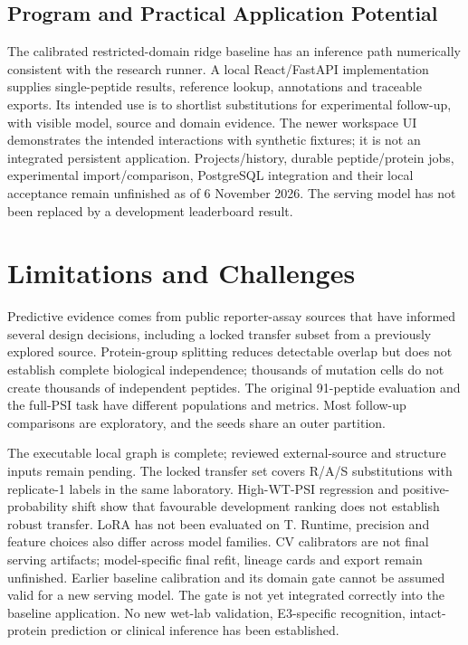 \subsection{Program and Practical Application Potential}
The calibrated restricted-domain ridge baseline has an inference path numerically consistent with
the research runner. A local React/FastAPI implementation supplies single-peptide results, reference
lookup, annotations and traceable exports. Its intended use is to shortlist substitutions for
experimental follow-up, with visible model, source and domain evidence.
The newer workspace UI demonstrates the intended interactions with synthetic fixtures; it is not
an integrated persistent application. Projects/history, durable peptide/protein jobs, experimental
import/comparison, PostgreSQL integration and their local acceptance remain unfinished as of
6 November 2026. The serving model has not been replaced by a development leaderboard result.

\section{Limitations and Challenges}
Predictive evidence comes from public reporter-assay sources that have informed several design
decisions, including a locked transfer subset from a previously explored source. Protein-group
splitting reduces detectable overlap but does not establish
complete biological independence; thousands of mutation cells do not create thousands of independent
peptides. The original 91-peptide evaluation and the full-PSI task have different populations and
metrics. Most follow-up comparisons are exploratory, and the seeds share an outer partition.

The executable local graph is complete; reviewed external-source and structure inputs remain pending.
The locked transfer set covers R/A/S substitutions with replicate-1 labels in the same laboratory.
High-WT-PSI regression and positive-probability shift show that favourable development ranking does
not establish robust transfer. LoRA has not been evaluated on T. Runtime, precision and feature
choices also differ across model families. CV calibrators are not final serving artifacts; model-specific
final refit, lineage cards and export remain unfinished. Earlier baseline calibration and its domain
gate cannot be assumed valid for a new serving model.
The gate is not yet integrated correctly into the baseline application. No new wet-lab validation,
E3-specific recognition, intact-protein prediction or clinical inference has been established.

